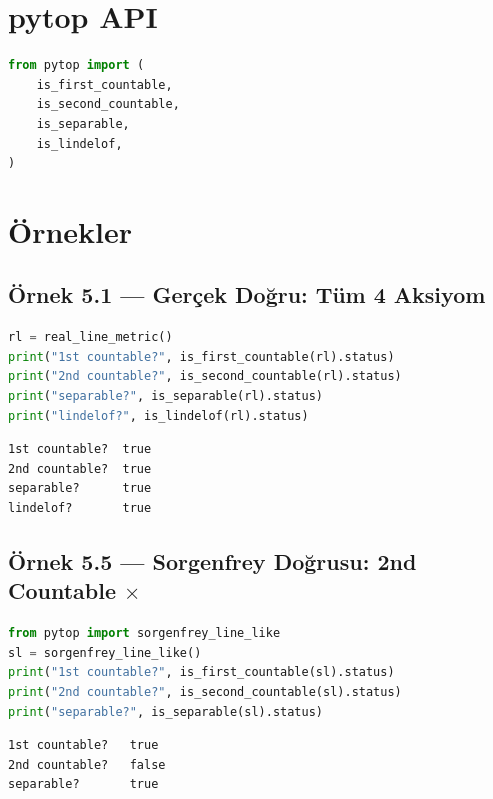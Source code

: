 \section{pytop API}

\begin{lstlisting}[language=Python]
from pytop import (
    is_first_countable,
    is_second_countable,
    is_separable,
    is_lindelof,
)
\end{lstlisting}

\section{Örnekler}

\subsection*{Örnek 5.1 — Gerçek Doğru: Tüm 4 Aksiyom}

\begin{lstlisting}[language=Python]
rl = real_line_metric()
print("1st countable?", is_first_countable(rl).status)
print("2nd countable?", is_second_countable(rl).status)
print("separable?", is_separable(rl).status)
print("lindelof?", is_lindelof(rl).status)
\end{lstlisting}

\begin{verbatim}
1st countable?  true
2nd countable?  true
separable?      true
lindelof?       true
\end{verbatim}

\subsection*{Örnek 5.5 — Sorgenfrey Doğrusu: 2nd Countable $\times$}

\begin{lstlisting}[language=Python]
from pytop import sorgenfrey_line_like
sl = sorgenfrey_line_like()
print("1st countable?", is_first_countable(sl).status)
print("2nd countable?", is_second_countable(sl).status)
print("separable?", is_separable(sl).status)
\end{lstlisting}

\begin{verbatim}
1st countable?   true
2nd countable?   false
separable?       true
\end{verbatim}


